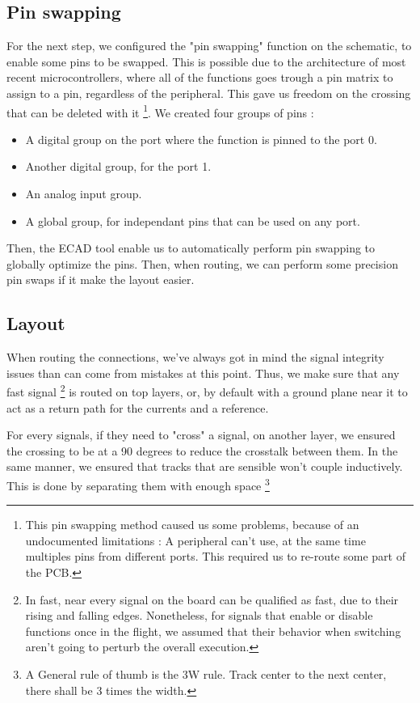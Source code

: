 \subsection{Pin swapping}\label{sec:pin_swap}
For the next step, we configured the "pin swapping" function on the schematic, to enable some pins
to be swapped. This is possible due to the architecture of most recent microcontrollers, where all
of the functions goes trough a pin matrix to assign to a pin, regardless of the peripheral. This
gave us freedom on the crossing that can be deleted with it \footnote{
    This pin swapping method caused us some problems, because of an undocumented limitations : A
    peripheral can't use, at the same time multiples pins from different ports. This required
    us to re-route some part of the PCB.
}.
We created four groups of pins :
\begin{itemize}[noitemsep]
    \item   A digital group on the port where the function is pinned to the port 0.
    \item   Another digital group, for the port 1.
    \item   An analog input group.
    \item   A global group, for independant pins that can be used on any port.
\end{itemize}

Then, the ECAD tool enable us to automatically perform pin swapping to globally optimize the pins.
Then, when routing, we can perform some precision pin swaps if it make the layout easier.

\subsection{Layout}
When routing the connections, we've always got in mind the signal integrity issues than can come
from mistakes at this point.
Thus, we make sure that any fast signal \footnote{
    In fast, near every signal on the board can be qualified as fast, due to their rising and falling
    edges. Nonetheless, for signals that enable or disable functions once in the flight, we assumed
    that their behavior when switching aren't going to perturb the overall execution.
} is routed on top layers, or, by default with a ground plane near it to act as a return path for the
currents and a reference.

For every signals, if they need to "cross" a signal, on another layer, we ensured the crossing to be
at a 90 degrees to reduce the crosstalk between them. In the same manner, we ensured that tracks that
are sensible won't couple inductively. This is done by separating them with enough space \footnote{A
    General rule of thumb is the 3W rule. Track center to the next center, there shall be 3 times the
    width.}

